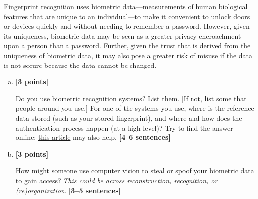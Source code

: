 \documentclass[11pt]{article}
\begin{document}
Fingerprint recognition uses biometric data---measurements of human biological features that are unique to an individual---to make it convenient to unlock doors or devices quickly and without needing to remember a password. However, given its uniqueness, biometric data may be seen as a greater privacy encroachment upon a person than a password. Further, given the trust that is derived from the uniqueness of biometric data, it may also pose a greater risk of misuse if the data is not secure because the data cannot be changed.

\begin{enumerate}[(a)]
    \item \textbf{[3 points]}
    \begin{tcolorbox}[colback=orange!5!white,colframe=orange!75!black]
    Do you use biometric recognition systems? List them. [If not, list some that people around you use.]
    For one of the systems you use, where is the reference data stored (such as your stored fingerprint), and where and how does the authentication process happen (at a high level)? 
    Try to find the answer online; \href{https://ievoreader.com/how-biometric-data-is-stored/}{this article} may also help. \textbf{[4--6 sentences]}
    \end{tcolorbox}
    

    \pagebreak
    \item \textbf{[3 points]}
    \begin{tcolorbox}[colback=orange!5!white,colframe=orange!75!black]
    How might someone use computer vision to steal or spoof your biometric data to gain access? \emph{This could be across reconstruction, recognition, or (re)organization.} \textbf{[3--5 sentences]}
    \end{tcolorbox}

\end{enumerate}
\end{document}
